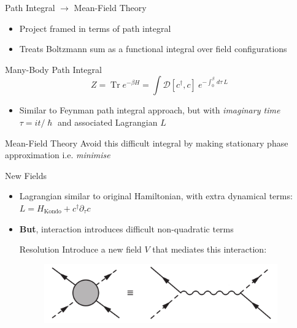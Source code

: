\documentclass[13pt]{beamer}
\DeclareMathOperator{\Tr}{Tr}
\begin{document}
  \begin{frame}{Path Integral $ \rightarrow $ Mean-Field Theory}

  \begin{itemize}
    \item Project framed in terms of path integral
    \item Treats Boltzmann sum as a functional integral over field configurations
  \end{itemize}

    \begin{block}{Many-Body Path Integral}
      $$ Z = \Tr{e^{- \beta H}} = \int \mathcal{D} [c^\dagger, c]~e^{-\int_{0}^{\beta} \,d\tau~L} $$
    \end{block}

  \begin{itemize}
    \item Similar to Feynman path integral approach, but with \textit{imaginary time} $ \tau = i t / \hslash $ and associated Lagrangian $ L $
  \end{itemize}

  \begin{block}{Mean-Field Theory}
    Avoid this difficult integral by making stationary phase approximation \hfill i.e. \alert{\textit{minimise}}
  \end{block}

  \end{frame}

  \begin{frame}{New Fields}

  \begin{itemize}
    \item Lagrangian similar to original Hamiltonian, with extra dynamical terms: $ L = H_{\text{Kondo}} + c^\dagger \partial_\tau c$
    \item \textbf{But}, interaction introduces difficult non-quadratic terms

    \vfill

    \begin{alertblock}{Resolution} %
      Introduce a new field $ V $ that mediates this interaction:
      \begin{figure}
        \centering
        \includegraphics[width=0.95\textwidth]{Figures/V_field.png}
      \end{figure}
    \end{alertblock}
  \end{itemize}

  \end{frame}
\end{document}
